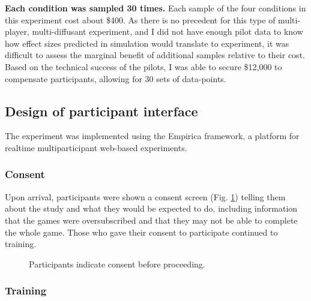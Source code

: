 \documentclass{article}
\begin{document}
\textbf{Each condition was sampled 30 times.}
Each sample of the four conditions in this experiment cost about \$400. As there is no precedent for this type of multi-player, multi-diffusant experiment, and I did not have enough pilot data to know how effect sizes predicted in simulation would translate to experiment, it was difficult to assess the marginal benefit of additional samples relative to their cost. Based on the technical success of the pilots, I was able to secure \$12,000 to compensate participants, allowing for 30 sets of data-points.

\subsection{Design of participant interface}
\label{interface}
The experiment was implemented using the Empirica \cite{almaatouq2021empirica} framework, a platform for realtime multiparticipant web-based experiments.

\subsubsection{Consent}
Upon arrival, participants were shown a consent screen (Fig. \ref{fig:consent}) telling them about the study and what they would be expected to do, including information that the games were oversubscribed and that they may not be able to complete the whole game. Those who gave their consent to participate continued to training.


\begin{figure}[h!]
\centering
{}
\caption{Participants indicate consent before proceeding.}
\label{fig:consent}
\end{figure}

\subsubsection{Training}
\end{document}
